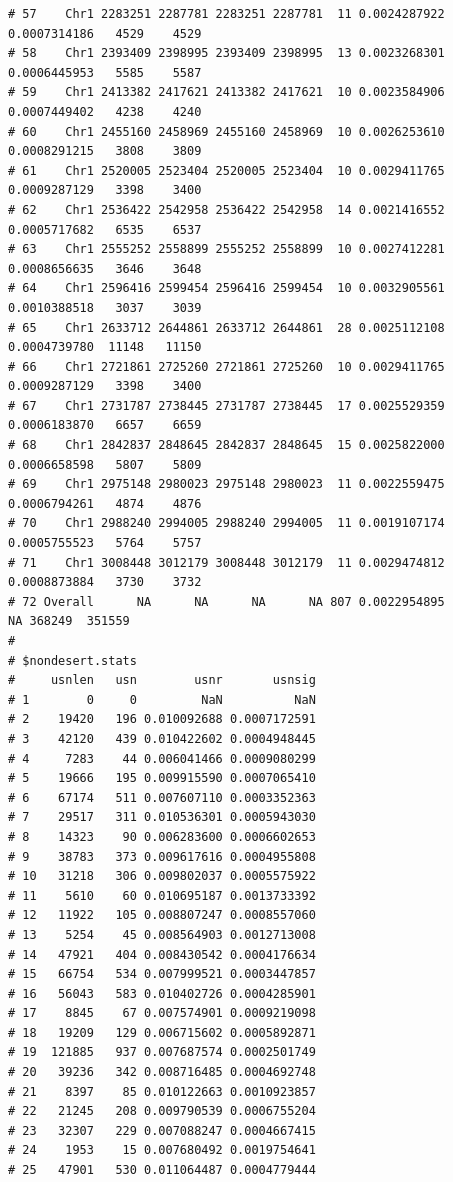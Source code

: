 \documentclass{article}\usepackage[]{graphicx}\usepackage[]{color}
\makeatletter
\newenvironment{kframe}{%
 \def\at@end@of@kframe{}%
 \ifinner\ifhmode%
  \def\at@end@of@kframe{\end{minipage}}%
  \begin{minipage}{\columnwidth}%
 \fi\fi%
 \def\FrameCommand##1{\hskip\@totalleftmargin \hskip-\fboxsep
 \colorbox{shadecolor}{##1}\hskip-\fboxsep
     \hskip-\linewidth \hskip-\@totalleftmargin \hskip\columnwidth}%
 \MakeFramed {\advance\hsize-\width
   \@totalleftmargin\z@ \linewidth\hsize
   \@setminipage}}%
 {\par\unskip\endMakeFramed%
 \at@end@of@kframe}
\newenvironment{knitrout}{}{} %
\makeatother
\begin{document}
\begin{knitrout}
\begin{kframe}
\begin{verbatim}
# 57    Chr1 2283251 2287781 2283251 2287781  11 0.0024287922 0.0007314186   4529    4529
# 58    Chr1 2393409 2398995 2393409 2398995  13 0.0023268301 0.0006445953   5585    5587
# 59    Chr1 2413382 2417621 2413382 2417621  10 0.0023584906 0.0007449402   4238    4240
# 60    Chr1 2455160 2458969 2455160 2458969  10 0.0026253610 0.0008291215   3808    3809
# 61    Chr1 2520005 2523404 2520005 2523404  10 0.0029411765 0.0009287129   3398    3400
# 62    Chr1 2536422 2542958 2536422 2542958  14 0.0021416552 0.0005717682   6535    6537
# 63    Chr1 2555252 2558899 2555252 2558899  10 0.0027412281 0.0008656635   3646    3648
# 64    Chr1 2596416 2599454 2596416 2599454  10 0.0032905561 0.0010388518   3037    3039
# 65    Chr1 2633712 2644861 2633712 2644861  28 0.0025112108 0.0004739780  11148   11150
# 66    Chr1 2721861 2725260 2721861 2725260  10 0.0029411765 0.0009287129   3398    3400
# 67    Chr1 2731787 2738445 2731787 2738445  17 0.0025529359 0.0006183870   6657    6659
# 68    Chr1 2842837 2848645 2842837 2848645  15 0.0025822000 0.0006658598   5807    5809
# 69    Chr1 2975148 2980023 2975148 2980023  11 0.0022559475 0.0006794261   4874    4876
# 70    Chr1 2988240 2994005 2988240 2994005  11 0.0019107174 0.0005755523   5764    5757
# 71    Chr1 3008448 3012179 3008448 3012179  11 0.0029474812 0.0008873884   3730    3732
# 72 Overall      NA      NA      NA      NA 807 0.0022954895           NA 368249  351559
# 
# $nondesert.stats
#     usnlen   usn        usnr       usnsig
# 1        0     0         NaN          NaN
# 2    19420   196 0.010092688 0.0007172591
# 3    42120   439 0.010422602 0.0004948445
# 4     7283    44 0.006041466 0.0009080299
# 5    19666   195 0.009915590 0.0007065410
# 6    67174   511 0.007607110 0.0003352363
# 7    29517   311 0.010536301 0.0005943030
# 8    14323    90 0.006283600 0.0006602653
# 9    38783   373 0.009617616 0.0004955808
# 10   31218   306 0.009802037 0.0005575922
# 11    5610    60 0.010695187 0.0013733392
# 12   11922   105 0.008807247 0.0008557060
# 13    5254    45 0.008564903 0.0012713008
# 14   47921   404 0.008430542 0.0004176634
# 15   66754   534 0.007999521 0.0003447857
# 16   56043   583 0.010402726 0.0004285901
# 17    8845    67 0.007574901 0.0009219098
# 18   19209   129 0.006715602 0.0005892871
# 19  121885   937 0.007687574 0.0002501749
# 20   39236   342 0.008716485 0.0004692748
# 21    8397    85 0.010122663 0.0010923857
# 22   21245   208 0.009790539 0.0006755204
# 23   32307   229 0.007088247 0.0004667415
# 24    1953    15 0.007680492 0.0019754641
# 25   47901   530 0.011064487 0.0004779444

\end{verbatim}
\end{kframe}
\end{knitrout}
\end{document}
